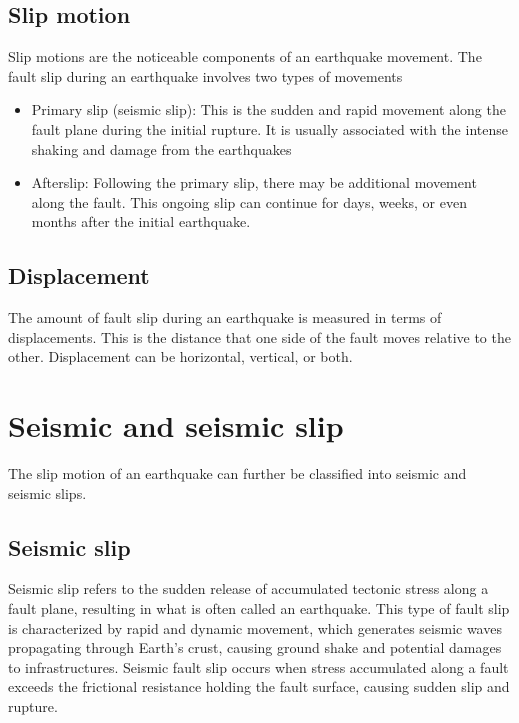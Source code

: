 \subsection{Slip motion}
Slip motions are the noticeable components of an earthquake movement.
The fault slip during an earthquake involves two types of movements
\begin{itemize}
    \item Primary slip (seismic slip): This is the sudden and rapid movement along the fault plane during the initial rupture. It is usually associated with the intense shaking and damage from the earthquakes
    \item Afterslip: Following the primary slip, there may be additional movement along the fault. This ongoing slip can continue for days, weeks, or even months after the initial earthquake.
\end{itemize}

\subsection{Displacement}
The amount of fault slip during an earthquake is measured in terms of displacements. 
This is the distance that one side of the fault moves relative to the other.
Displacement can be horizontal, vertical, or both.


\section{Seismic and seismic slip}
The slip motion of an earthquake can further be classified into seismic and seismic slips.
\subsection{Seismic slip}
Seismic slip refers to the sudden release of accumulated tectonic stress along a fault plane, resulting in what is often called an earthquake.
This type of fault slip is characterized by rapid and dynamic movement, which generates seismic waves propagating through Earth's crust, causing ground shake and potential damages to infrastructures.
Seismic fault slip occurs when stress accumulated along a fault exceeds the frictional resistance holding the fault surface, causing sudden slip and rupture.

